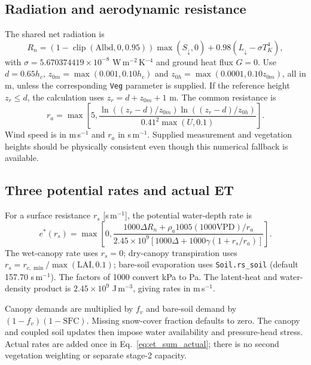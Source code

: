 \documentclass[12pt]{article}
\begin{document}
\subsection{Radiation and aerodynamic resistance}
The shared net radiation is
\begin{equation}
R_n=(1-\operatorname{clip}(\mathrm{Albd},0,0.95))\max(S_\downarrow,0)
+0.98\left(L_\downarrow-\sigma T_K^4\right),
\end{equation}
with $\sigma=5.670374419\times10^{-8}$ W\,m$^{-2}$\,K$^{-4}$ and ground heat flux $G=0$.
Use $d=0.65h_c$, $z_{0m}=\max(0.001,0.10h_c)$ and $z_{0h}=\max(0.0001,0.10z_{0m})$, all in m, unless the corresponding \texttt{Veg} parameter is supplied. If the reference height $z_r\le d$, the calculation uses $z_r=d+z_{0m}+1$ m. The common resistance is
\begin{equation}
r_a=\max\left[5,\frac{\ln((z_r-d)/z_{0m})\ln((z_r-d)/z_{0h})}
{0.41^2\max(U,0.1)}\right].
\label{eq:ra_neutral}
\end{equation}
Wind speed is in m\,s$^{-1}$ and $r_a$ in s\,m$^{-1}$. Supplied measurement and vegetation heights should be physically consistent even though this numerical fallback is available.

\subsection{Three potential rates and actual ET}
For a surface resistance $r_s$ [s\,m$^{-1}$], the potential water-depth rate is
\begin{equation}
e^*(r_s)=\max\left[0,\frac{1000\Delta R_n+\rho_a1005(1000\mathrm{VPD})/r_a}
{2.45\times10^9\left[1000\Delta+1000\gamma(1+r_s/r_a)\right]}\right].
\label{eq:PM_wc}
\end{equation}
The wet-canopy rate uses $r_s=0$; dry-canopy transpiration uses $r_s=r_{c,\min}/\max(\mathrm{LAI},0.1)$; bare-soil evaporation uses \texttt{Soil.rs\_soil} (default 157.70 s\,m$^{-1}$). The factors of 1000 convert kPa to Pa. The latent-heat and water-density product is $2.45\times10^9$ J\,m$^{-3}$, giving rates in m\,s$^{-1}$.

Canopy demands are multiplied by $f_v$ and bare-soil demand by $(1-f_v)(1-\mathrm{SFC})$. Missing snow-cover fraction defaults to zero. The canopy and coupled soil updates then impose water availability and pressure-head stress. Actual rates are added once in Eq.~\eqref{eq:et_sum_actual}; there is no second vegetation weighting or separate stage-2 capacity.

%
\end{document}
